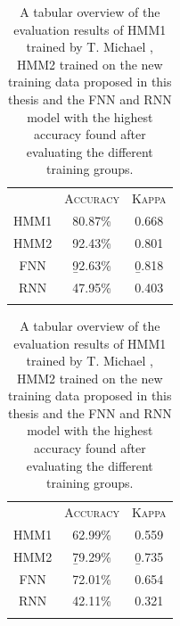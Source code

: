 \begin{table}[!ht]
	\centering
	\hfill
	{\centering\small{}\begin{tabular}{ c c c }
	\trule
	 & \textsc{Accuracy} & \textsc{Kappa} \\
	\srule
	HMM1 & 80.87\%     & 0.668     \\
	\mrule
	HMM2 & 92.43\%     & 0.801     \\
	\mrule
	FNN  & \b{92.63\%} & \b{0.818} \\
	\mrule
	RNN  & 47.95\%     & 0.403     \\
	\brule
	\end{tabular}}
	\hfill
	{\centering\small{}\begin{tabular}{ c c c }
	\trule
	 & \textsc{Accuracy} & \textsc{Kappa} \\
	\srule
	HMM1 & 62.99\%     & 0.559     \\
	\mrule
	HMM2 & \b{79.29\%} & \b{0.735} \\
	\mrule
	FNN  & 72.01\%     & 0.654     \\
	\mrule
	RNN  & 42.11\%     & 0.321     \\
	\brule
	\end{tabular}}
	\hfill
	\vspace{.8em}
	\caption[Comparison of all Architectures]{A tabular overview of the evaluation results of HMM1 trained by T. Michael \cite{michael2016}, HMM2 trained on the new training data proposed in this thesis and the FNN and RNN model with the highest accuracy found after evaluating the different training groups.}
	\label{t.evaluation.comparison}
\end{table}

